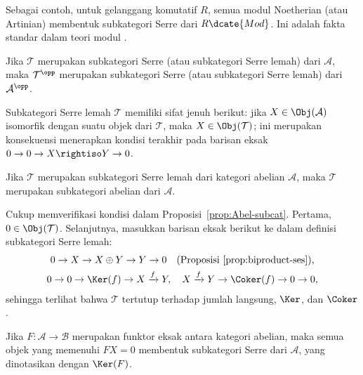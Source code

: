 Sebagai contoh, untuk gelanggang komutatif $R$, semua modul Noetherian
(atau Artinian) membentuk subkategori Serre dari $R\dcate{Mod}$.
Ini adalah fakta standar dalam teori modul \cite[Lema 6.10.2]{Li1}.

Jika $\mathcal{T}$ merupakan subkategori Serre (atau subkategori Serre lemah)
dari $\mathcal{A}$, maka $\mathcal{T}^{\opp}$ merupakan subkategori Serre
(atau subkategori Serre lemah) dari $\mathcal{A}^{\opp}$.

Subkategori Serre lemah $\mathcal{T}$ memiliki sifat jenuh berikut: jika
$X\in\Obj(\mathcal{A})$ isomorfik dengan suatu objek dari $\mathcal{T}$, maka
$X\in\Obj(\mathcal{T})$; ini merupakan konsekuensi menerapkan kondisi terakhir
pada barisan eksak $0\to0\to X\rightiso Y\to0$.

\begin{korolari}\label{prop:Serre-subcat-abelian}
Jika $\mathcal{T}$ merupakan subkategori Serre lemah dari kategori abelian
$\mathcal{A}$, maka $\mathcal{T}$ merupakan subkategori abelian dari
$\mathcal{A}$.
\end{korolari}

\begin{bukti}
Cukup memverifikasi kondisi dalam Proposisi~\ref{prop:Abel-subcat}. Pertama,
$0\in\Obj(\mathcal{T})$. Selanjutnya, masukkan barisan eksak berikut ke dalam
definisi subkategori Serre lemah:
\begin{gather*}
	0\to X\to X\oplus Y\to Y\to0
	\quad\text{(Proposisi~\ref{prop:biproduct-ses})},\\
	0\to0\to\Ker(f)\to X\xrightarrow{f}Y,\quad
	X\xrightarrow{f}Y\to\Coker(f)\to0\to0,
\end{gather*}
sehingga terlihat bahwa $\mathcal{T}$ tertutup terhadap jumlah langsung,
$\Ker$, dan $\Coker$.
\end{bukti}

\begin{contoh}
Jika $F:\mathcal{A}\to\mathcal{B}$ merupakan funktor eksak antara kategori
abelian, maka semua objek yang memenuhi $FX=0$ membentuk subkategori Serre
dari $\mathcal{A}$, yang dinotasikan dengan $\Ker(F)$.
\end{contoh}

